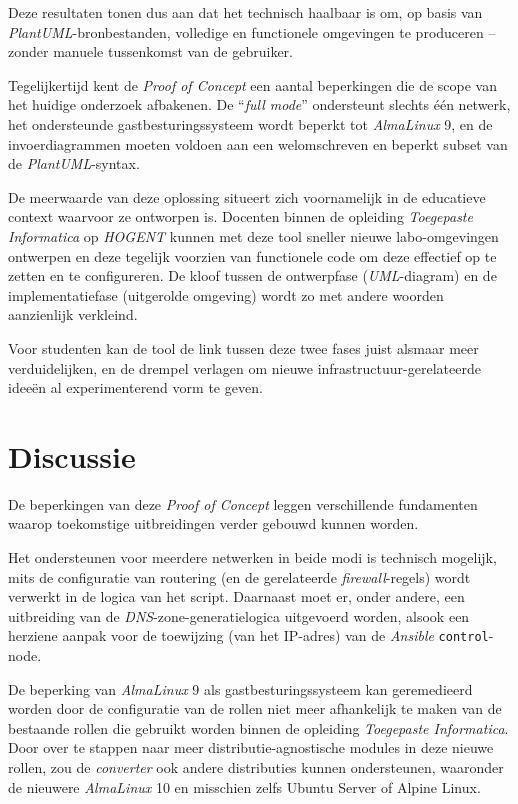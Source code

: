 Deze resultaten tonen dus aan dat het technisch haalbaar is om, op basis van \emph{PlantUML}-bronbestanden, volledige en functionele omgevingen te produceren -- zonder manuele tussenkomst van de gebruiker.

Tegelijkertijd kent de \emph{Proof of Concept} een aantal beperkingen die de scope van het huidige onderzoek afbakenen. De ``\emph{full mode}'' ondersteunt slechts één netwerk, het ondersteunde gastbesturingssysteem wordt beperkt tot \emph{AlmaLinux} 9, en de invoerdiagrammen moeten voldoen aan een welomschreven en beperkt subset van de \emph{PlantUML}-syntax.

De meerwaarde van deze oplossing situeert zich voornamelijk in de educatieve context waarvoor ze ontworpen is. Docenten binnen de opleiding \emph{Toegepaste Informatica} op \emph{HOGENT} kunnen met deze tool sneller nieuwe labo-omgevingen ontwerpen en deze tegelijk voorzien van functionele code om deze effectief op te zetten en te configureren. De kloof tussen de ontwerpfase (\emph{UML}-diagram) en de implementatiefase (uitgerolde omgeving) wordt zo met andere woorden aanzienlijk verkleind.

Voor studenten kan de tool de link tussen deze twee fases juist alsmaar meer verduidelijken, en de drempel verlagen om nieuwe infrastructuur-gerelateerde ideeën al experimenterend vorm te geven.

\section{Discussie}%
\label{sec:discussie}

De beperkingen van deze \emph{Proof of Concept} leggen verschillende fundamenten waarop toekomstige uitbreidingen verder gebouwd kunnen worden.

Het ondersteunen voor meerdere netwerken in beide modi is technisch mogelijk, mits de configuratie van routering (en de gerelateerde \emph{firewall}-regels) wordt verwerkt in de logica van het script. Daarnaast moet er, onder andere, een uitbreiding van de \emph{DNS}-zone-generatielogica uitgevoerd worden, alsook een herziene aanpak voor de toewijzing (van het IP-adres) van de \emph{Ansible} \texttt{control}-node.

De beperking van \emph{AlmaLinux} 9 als gastbesturingssysteem kan geremedieerd worden door de configuratie van de rollen niet meer afhankelijk te maken van de bestaande rollen die gebruikt worden binnen de opleiding \emph{Toegepaste Informatica}. Door over te stappen naar meer distributie-agnostische modules in deze  nieuwe rollen, zou de \emph{converter} ook andere distributies kunnen ondersteunen, waaronder de nieuwere \emph{AlmaLinux} 10 en misschien zelfs Ubuntu Server of Alpine Linux.

